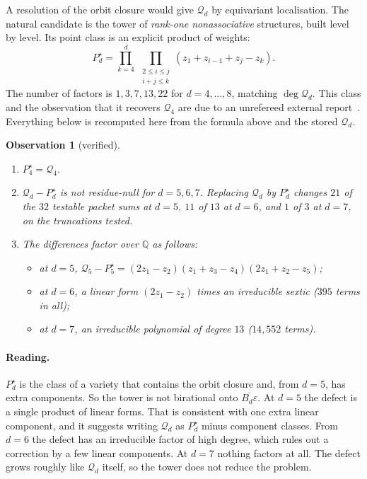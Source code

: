 \documentclass[11pt,a4paper]{article}
\newcommand{\Qd}{\mathcal{Q}}
\theoremstyle{plain}
\newtheorem{observation}{Observation}
\begin{document}
A resolution of the orbit closure would give $\Qd_d$ by equivariant localisation. The natural
candidate is the tower of \emph{rank-one nonassociative} structures, built level by level. Its
point class is an explicit product of weights:
\[
  P^\star_d = \prod_{k=4}^{d} \ \prod_{\substack{2 \le i \le j \\ i + j \le k}} (z_1 + z_{i-1} + z_j - z_k).
\]
The number of factors is $1, 3, 7, 13, 22$ for $d = 4, \dots, 8$, matching $\deg \Qd_d$. This class and
the observation that it recovers $\Qd_4$ are due to an unrefereed external
report~\cite{FS}. Everything below is recomputed here from the formula above and the stored
$\Qd_d$.

\begin{observation}[verified]\label{obs}
\begin{enumerate}[nosep]
\item $P^\star_4 = \Qd_4$.
\item $\Qd_d - P^\star_d$ is not residue-null for $d = 5, 6, 7$. Replacing $\Qd_d$ by $P^\star_d$
  changes $21$ of the $32$ testable packet sums at $d = 5$, $11$ of $13$ at $d = 6$, and $1$ of $3$ at
  $d = 7$, on the truncations tested.
\item The differences factor over $\mathbb{Q}$ as follows:
  \begin{itemize}[nosep]
  \item at $d = 5$, $\Qd_5 - P^\star_5 = (2z_1 - z_2)(z_1 + z_3 - z_4)(2z_1 + z_2 - z_5)$;
  \item at $d = 6$, a linear form $(2z_1 - z_2)$ times an irreducible sextic ($395$ terms in all);
  \item at $d = 7$, an irreducible polynomial of degree $13$ ($14{,}552$ terms).
  \end{itemize}
\end{enumerate}
\end{observation}

\paragraph{Reading.} $P^\star_d$ is the class of a variety that contains the orbit closure and,
from $d = 5$, has extra components. So the tower is not birational onto
$\overline{B_d\varepsilon}$. At $d = 5$ the defect is a single product of linear forms. That is
consistent with one extra linear component, and it suggests writing $\Qd_d$ as $P^\star_d$ minus
component classes. From $d = 6$ the defect has an irreducible factor of high degree, which rules
out a correction by a few linear components. At $d = 7$ nothing factors at all. The defect grows
roughly like $\Qd_d$ itself, so the tower does not reduce the problem.
\end{document}
